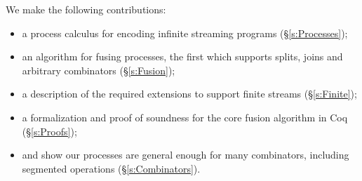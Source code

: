 We make the following contributions:
\begin{itemize}
\item a process calculus for encoding infinite streaming programs (\S\ref{s:Processes});
\item an algorithm for fusing processes, the first which supports splits, joins and arbitrary combinators (\S\ref{s:Fusion});
\item a description of the required extensions to support finite streams (\S\ref{s:Finite});
\item a formalization and proof of soundness for the core fusion algorithm in Coq (\S\ref{s:Proofs});
\item and show our processes are general enough for many combinators, including segmented operations (\S\ref{s:Combinators}).
\end{itemize}






